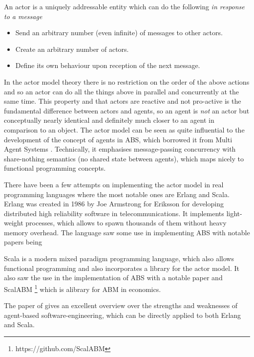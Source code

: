 An actor is a uniquely addressable entity which can do the following \textit{in response to a message}
\begin{itemize}
	\item Send an arbitrary number (even infinite) of messages to other actors.
	\item Create an arbitrary number of actors.
	\item Define its own behaviour upon reception of the next message.
\end{itemize}

In the actor model theory there is no restriction on the order of the above actions and so an actor can do all the things above in parallel and concurrently at the same time. This property and that actors are reactive and not pro-active is the fundamental difference between actors and agents, so an agent is \textit{not} an actor but conceptually nearly identical and definitely much closer to an agent in comparison to an object. The actor model can be seen as quite influential to the development of the concept of agents in ABS, which borrowed it from Multi Agent Systems \cite{wooldridge_introduction_2009}. Technically, it emphasises message-passing concurrency with share-nothing semantics (no shared state between agents), which maps nicely to functional programming concepts.

There have been a few attempts on implementing the actor model in real programming languages where the most notable ones are Erlang and Scala. Erlang was created in 1986 by Joe Armstrong for Eriksson for developing distributed high reliability software in telecommunications. It implements light-weight processes, which allows to spawn thousands of them without heavy memory overhead. The language saw some use in implementing ABS with notable papers being \cite{di_stefano_using_2005, di_stefano_exat:_2007, varela_modelling_2004, sher_agent-based_2013, bezirgiannis_improving_2013}

Scala is a modern mixed paradigm programming language, which also allows functional programming and also incorporates a library for the actor model. It also saw the use in the implementation of ABS with a notable paper \cite{krzywicki_massively_2015} and ScalABM \footnote{https://github.com/ScalABM} which is alibrary for ABM in economics.

The paper of \cite{jennings_agent-based_2000} gives an excellent overview over the strengths and weaknesses of agent-based software-engineering, which can be directly applied to both Erlang and Scala.

